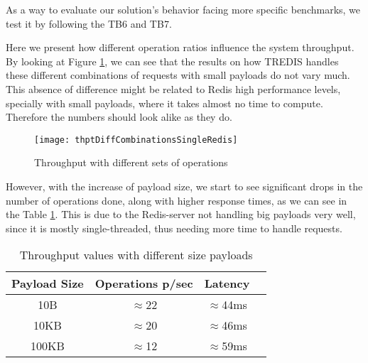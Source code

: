 As a way to evaluate our solution's behavior facing more specific benchmarks, we test it by following the TB6 and TB7. 

Here we present how different operation ratios influence the system throughput. By looking at Figure \ref{fig:thptDiffCombinationsSingleRedis}, we can see that the results on how TREDIS handles these different combinations of requests with small payloads do not vary much. This absence of difference might be related to Redis high performance levels, specially with small payloads, where it takes almost no time to compute. Therefore the numbers should look alike as they do.  

\begin{figure}[htbp]
	\centering
	{\texttt{[image: thptDiffCombinationsSingleRedis]}}
	\caption{Throughput with different sets of operations}
	\label{fig:thptDiffCombinationsSingleRedis}
\end{figure}

However, with the increase of payload size, we start to see significant drops in the number of operations done, along with higher response times, as we can see in the Table \ref{table:throughputPayloads}. This is due to the Redis-server not handling big payloads very well, since it is mostly single-threaded, thus needing more time to handle requests.

\begin{table}[ht]
	\caption{Throughput values with different size payloads} %
	\centering %
	\begin{tabular}{c c c c} %
		\hline\hline %
		\textbf{Payload Size} & \textbf{Operations p/sec} & \textbf{Latency}\\ [0.5ex] %
		\hline
		10B & $\approx$22 & $\approx$44ms\\
		\hline
		10KB & $\approx$20 & $\approx$46ms\\
		\hline %
		100KB & $\approx$12 & $\approx$59ms\\ [1ex] %
		\hline %
	\end{tabular}
	\label{table:throughputPayloads} %
\end{table} 

